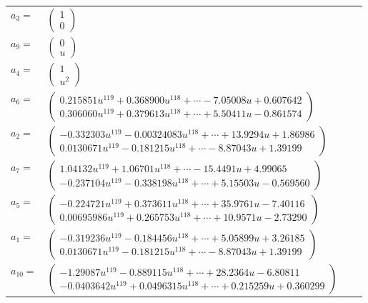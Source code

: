 \documentclass[1p]{elsarticle_modified}
\theoremstyle{definition}
\begin{document}
\begin{tabular}{m{7pt} m{180pt} m{7pt} m{180pt} }
\flushright $a_{3}=$&$\begin{pmatrix}1\\0\end{pmatrix}$ \\
\flushright $a_{9}=$&$\begin{pmatrix}0\\u\end{pmatrix}$ \\
\flushright $a_{4}=$&$\begin{pmatrix}1\\u^2\end{pmatrix}$ \\
\flushright $a_{6}=$&$\begin{pmatrix}0.215851 u^{119}+0.368900 u^{118}+\cdots-7.05008 u+0.607642\\0.306060 u^{119}+0.379613 u^{118}+\cdots+5.50411 u-0.861574\end{pmatrix}$ \\
\flushright $a_{2}=$&$\begin{pmatrix}-0.332303 u^{119}-0.00324083 u^{118}+\cdots+13.9294 u+1.86986\\0.0130671 u^{119}-0.181215 u^{118}+\cdots-8.87043 u+1.39199\end{pmatrix}$ \\
\flushright $a_{7}=$&$\begin{pmatrix}1.04132 u^{119}+1.06701 u^{118}+\cdots-15.4491 u+4.99065\\-0.237104 u^{119}-0.338198 u^{118}+\cdots+5.15503 u-0.569560\end{pmatrix}$ \\
\flushright $a_{5}=$&$\begin{pmatrix}-0.224721 u^{119}+0.373611 u^{118}+\cdots+35.9761 u-7.40116\\0.00695986 u^{119}+0.265753 u^{118}+\cdots+10.9571 u-2.73290\end{pmatrix}$ \\
\flushright $a_{1}=$&$\begin{pmatrix}-0.319236 u^{119}-0.184456 u^{118}+\cdots+5.05899 u+3.26185\\0.0130671 u^{119}-0.181215 u^{118}+\cdots-8.87043 u+1.39199\end{pmatrix}$ \\
\flushright $a_{10}=$&$\begin{pmatrix}-1.29087 u^{119}-0.889115 u^{118}+\cdots+28.2364 u-6.80811\\-0.0403642 u^{119}+0.0496315 u^{118}+\cdots+0.215259 u+0.360299\end{pmatrix}$ \\

\end{tabular}
\end{document}

